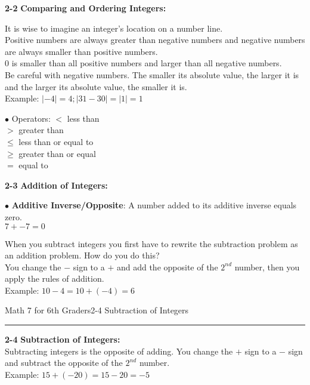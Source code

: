 \begin{enumerate*}
		\item[\Large\textbf{2-2}] \Large\textbf{Comparing and Ordering Integers:}\\
			\begin{enumerate*}
				\item[]It is wise to imagine an integer's location on a number line.\\
				Positive numbers are always greater than negative numbers and negative numbers are always smaller than positive numbers.\\
				0 is smaller than all positive numbers and larger than all negative numbers.\\
				Be careful with negative numbers. The smaller its absolute value, the larger it is and the larger its absolute value, the smaller it is.\\
				Example: $|-4|=4; |31-30|=|1|=1$\\
				\item[$\bullet$]Operators:
					$<$ less than\\ $>$ greater than\\ $\leq$ less than or equal to\\ $\geq$ greater than or equal\\ $=$ equal to\\
			\end{enumerate*}
			
		\item[\Large\textbf{2-3}] \Large\textbf{Addition of Integers:}\\
			\begin{enumerate*}
				\item[$\bullet$]\textbf{Additive Inverse/Opposite}: A number added to its additive inverse equals zero.\\
				$7+-7=0$
				\item[]When you subtract integers you first have to rewrite the subtraction problem as an addition problem. How do you do this?\\
				You change the $-$ sign to a $+$ and add the opposite of the $2^{nd}$ number, then you apply the rules of addition.\\
				Example: $10-4=10+(-4)=6$\\
			\end{enumerate*}
			
\newpage
\noindent\Large{Math 7 for 6th Graders\hfill 2-4 Subtraction of Integers}
\noindent\hrule
\vspace{5mm}
			
		\item[\Large\textbf{2-4}] \Large\textbf{Subtraction of Integers:}\\
			Subtracting integers is the opposite of adding. You change the $+$ sign to a $-$ sign and subtract the opposite of the $2^{nd}$ number.\\
			Example: $15+(-20)=15-20=-5$\\
			

\end{enumerate*}
